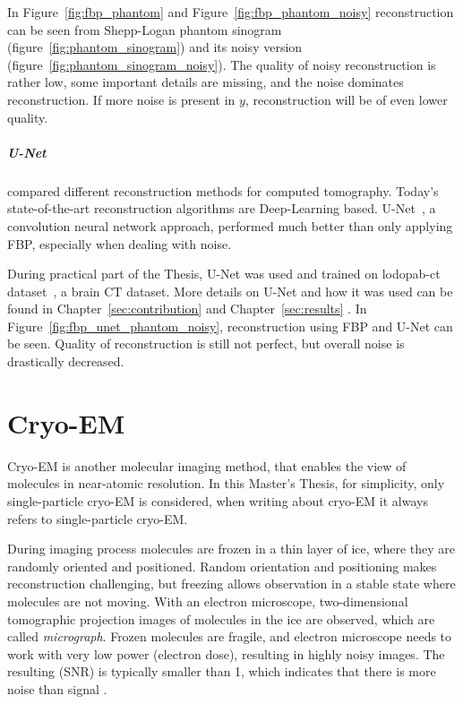 In Figure~\ref{fig:fbp_phantom} and Figure~\ref{fig:fbp_phantom_noisy} reconstruction can be seen from 
Shepp-Logan phantom sinogram (figure~\ref{fig:phantom_sinogram}) and its noisy version (figure~\ref{fig:phantom_sinogram_noisy}).
The quality of noisy reconstruction is rather low, some important details are missing, and the noise dominates reconstruction.
If more noise is present in $y$, reconstruction will be of even lower quality.

\subparagraph{U-Net}
\citet{ct-reconstruction-comparison} compared different reconstruction methods for computed tomography. 
Today's state-of-the-art reconstruction algorithms are Deep-Learning based.
U-Net~\cite{unet-tomography}, a convolution neural network approach, performed
much better than only applying FBP, especially when dealing with noise.

During practical part of the Thesis, U-Net was used and trained on lodopab-ct dataset~\cite{lodopab-dataset}, a brain CT dataset. 
More details on U-Net and how it was used can be found in 
Chapter~\ref{sec:contribution} \textit{} and 
Chapter~\ref{sec:results} \textit{}.
In Figure~\ref{fig:fbp_unet_phantom_noisy}, reconstruction using FBP and U-Net can be seen.
Quality of reconstruction is still not perfect, but overall noise is drastically decreased.


\section{Cryo-EM}
Cryo-EM is another molecular imaging method, that enables the view of molecules in near-atomic resolution.
In this Master's Thesis, for simplicity, only single-particle cryo-EM \cite{singleParticleCryoEm} is considered, 
when writing about cryo-EM it always refers to single-particle cryo-EM.

During imaging process molecules are frozen in a thin layer of ice, where they are randomly oriented and positioned. 
Random orientation and positioning makes reconstruction challenging, 
but freezing allows observation in a stable state where molecules are not moving.
With an electron microscope, two-dimensional tomographic projection images of molecules in the ice are observed,
which are called \textit{micrograph}. 
Frozen molecules are fragile, and electron microscope needs to work with
very low power (electron dose), resulting in highly noisy images. The resulting (SNR)
is typically smaller than 1, which indicates that there is more noise than signal \cite{cryoEmMath2}.

